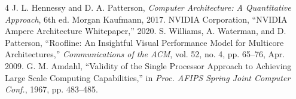 \documentclass[11pt,journal,onecolumn]{IEEEtran}
\begin{document}
\begin{thebibliography}{4}
J. L. Hennessy and D. A. Patterson, \textit{Computer Architecture: A Quantitative Approach}, 6th ed. Morgan Kaufmann, 2017.
NVIDIA Corporation, ``NVIDIA Ampere Architecture Whitepaper,'' 2020.
S. Williams, A. Waterman, and D. Patterson, ``Roofline: An Insightful Visual Performance Model for Multicore Architectures,'' \textit{Communications of the ACM}, vol. 52, no. 4, pp. 65--76, Apr. 2009.
G. M. Amdahl, ``Validity of the Single Processor Approach to Achieving Large Scale Computing Capabilities,'' in \textit{Proc. AFIPS Spring Joint Computer Conf.}, 1967, pp. 483--485.
\end{thebibliography}
\end{document}
